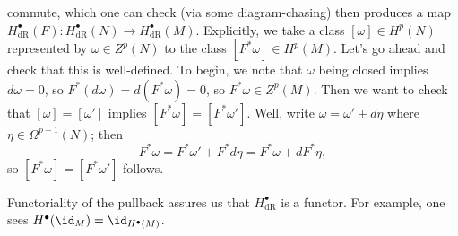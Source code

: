\documentclass[../notes.tex]{subfiles}
\begin{document}
commute, which one can check (via some diagram-chasing) then produces a map $H^\bullet_{\mathrm{dR}}(F)\colon H^\bullet_{\mathrm{dR}}(N)\to H^\bullet_{\mathrm{dR}}(M)$. Explicitly, we take a class $[\omega]\in H^p(N)$ represented by $\omega\in Z^p(N)$ to the class $[F^*\omega]\in H^p(M)$. Let's go ahead and check that this is well-defined. To begin, we note that $\omega$ being closed implies $d\omega=0$, so $F^*(d\omega)=d(F^*\omega)=0$, so $F^*\omega\in Z^p(M)$. Then we want to check that $[\omega]=[\omega']$ implies $[F^*\omega]=[F^*\omega']$. Well, write $\omega=\omega'+d\eta$ where $\eta\in\Omega^{p-1}(N)$; then
\[F^*\omega=F^*\omega'+F^*d\eta=F^*\omega+dF^*\eta,\]
so $[F^*\omega]=[F^*\omega']$ follows.
\begin{remark}
	Functoriality of the pullback assures us that $H^\bullet_{\mathrm{dR}}$ is a functor. For example, one sees $H^\bullet({\id_M})=\id_{H^\bullet(M)}$.
\end{remark}
\end{document}

